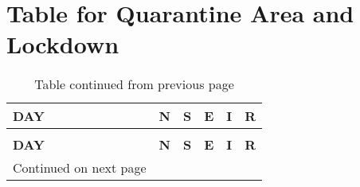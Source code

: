 \chapter{Table for Quarantine Area and Lockdown}


\begin{longtable}{|l|l|l|l|l|l|}
	\caption{Table for Quarantine Area and Lockdown} \\
	
	\toprule
	\textbf{DAY} & \textbf{N} & \textbf{S} & \textbf{E }& \textbf{I} &\textbf{ R} \\
	\midrule
	\endfirsthead
	\caption*{Table continued from previous page} \\
	\toprule
	\textbf{DAY} & \textbf{N} & \textbf{S} & \textbf{E }& \textbf{I} &\textbf{ R} \\
	\midrule
	\endhead
	\midrule
	\multicolumn{1}{r}{\footnotesize Continued on next page}
	\endfoot
	\bottomrule
	\endlastfoot
	

\end{longtable}
